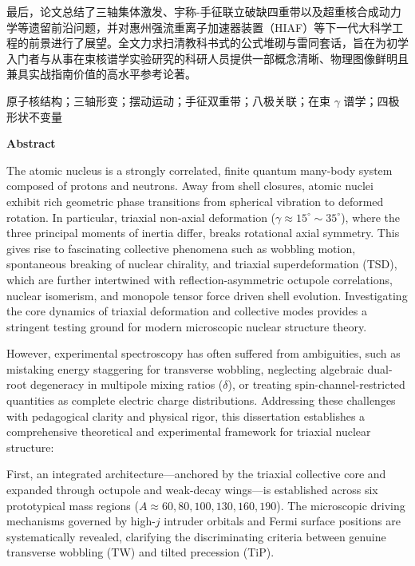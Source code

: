 最后，论文总结了三轴集体激发、宇称-手征联立破缺四重带以及超重核合成动力学等遗留前沿问题，并对惠州强流重离子加速器装置（HIAF）等下一代大科学工程的前景进行了展望。全文力求扫清教科书式的公式堆砌与雷同套话，旨在为初学入门者与从事在束核谱学实验研究的科研人员提供一部概念清晰、物理图像鲜明且兼具实战指南价值的高水平参考论著。

\vspace{\baselineskip}
{\fontsize{12pt}{18pt}\selectfont 原子核结构；三轴形变；摆动运动；手征双重带；八极关联；在束 $\gamma$ 谱学；四极形状不变量}

\newpage
\thispagestyle{plain}
\begin{center}
    \bfseries\fontsize{18pt}{27pt}\selectfont Abstract
\end{center}
\vspace{2.8mm}

\fontsize{12pt}{18pt}\selectfont
The atomic nucleus is a strongly correlated, finite quantum many-body system composed of protons and neutrons. Away from shell closures, atomic nuclei exhibit rich geometric phase transitions from spherical vibration to deformed rotation. In particular, triaxial non-axial deformation ($\gamma \approx 15^\circ \sim 35^\circ$), where the three principal moments of inertia differ, breaks rotational axial symmetry. This gives rise to fascinating collective phenomena such as wobbling motion, spontaneous breaking of nuclear chirality, and triaxial superdeformation (TSD), which are further intertwined with reflection-asymmetric octupole correlations, nuclear isomerism, and monopole tensor force driven shell evolution. Investigating the core dynamics of triaxial deformation and collective modes provides a stringent testing ground for modern microscopic nuclear structure theory.

However, experimental spectroscopy has often suffered from ambiguities, such as mistaking energy staggering for transverse wobbling, neglecting algebraic dual-root degeneracy in multipole mixing ratios ($\delta$), or treating spin-channel-restricted quantities as complete electric charge distributions. Addressing these challenges with pedagogical clarity and physical rigor, this dissertation establishes a comprehensive theoretical and experimental framework for triaxial nuclear structure:

First, an integrated architecture—anchored by the triaxial collective core and expanded through octupole and weak-decay wings—is established across six prototypical mass regions ($A \approx 60, 80, 100, 130, 160, 190$). The microscopic driving mechanisms governed by high-$j$ intruder orbitals and Fermi surface positions are systematically revealed, clarifying the discriminating criteria between genuine transverse wobbling (TW) and tilted precession (TiP).

